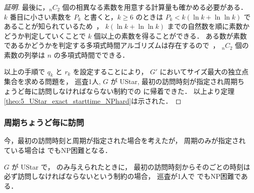\begin{proof}[証明]
	最後に，${}_n C_2$ 個の相異なる素数を用意する計算量も確かめる必要がある．
	$k$ 番目に小さい素数を $P_k$ と書くと，$k \geq 6$ のときは
	$P_k < k( \ln k + \ln\ln k )$ であることが知られているため~\cite{dusart1999k}，
	$k( \ln k + \ln\ln k )$ までの自然数を順に素数かどうか判定していくことで
	$k$ 個以上の素数を得ることができる．
	ある数が素数であるかどうかを判定する多項式時間アルゴリズムは存在するので~\cite{agrawal2004primes}，
	${}_n C_2$ 個の素数の列挙は $n$ の多項式時間でできる．

	以上の手順で $q_k$ と $r_k$ を設定することにより，
	$G'$ においてサイズ最大の独立点集合を求める問題を，
	巡査1人, $G$ が UStar,
	最初の訪問時刻が指定され周期ちょうど毎に訪問しなければならない制約での \optpp に帰着できた．
	以上より定理\ref{theo:5_UStar_exact_starttime_NPhard}は示された．
\end{proof}



\subsubsection{周期ちょうど毎に訪問}
今，最初の訪問時刻と周期が指定された場合を考えたが，
周期のみが指定されている場合は \decisionpp でもNP困難となる．

\begin{theo}
	\label{theo:6_UStar_exact_NPhard}
	$G$ が UStar で，
	{\period}のみ与えられたときに，
	最初の訪問時刻からその{\period}ごとの時刻は必ず訪問しなければならないという制約の場合，
	巡査が1人で \decisionpp でもNP困難である．
\end{theo}

